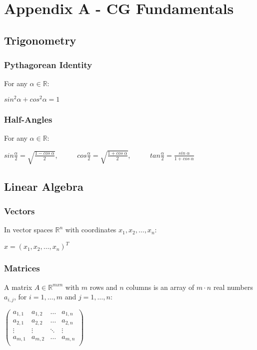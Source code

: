 \documentclass{article}
\begin{document}
\newpage

\section{Appendix A - CG Fundamentals}

\subsection{Trigonometry}
\subsubsection{Pythagorean Identity}
For any $ \alpha \in \mathbb{R} $:
\begin{center}
    $ sin^2\alpha + cos^2\alpha = 1 $
\end{center}
\subsubsection{Half-Angles}
For any $ \alpha \in \mathbb{R} $:
\begin{center}
    $ sin\displaystyle\frac{\alpha}{2} = \sqrt{\displaystyle\frac{1 - cos \ \alpha}{2}} $, \ \ \ \ \ 
    $ cos\displaystyle\frac{\alpha}{2} = \sqrt{\displaystyle\frac{1 + cos \ \alpha}{2}} $, \ \ \ \ \
    $ tan\displaystyle\frac{\alpha}{2} = \displaystyle\frac{sin \ \alpha}{1 + cos \ \alpha} $
\end{center}

\vspace{0.5cm}

\subsection{Linear Algebra}
\subsubsection{Vectors}
In vector spaces $\mathbb{R}^n$ with coordinates $x_1, x_2, \dots, x_n$:
\begin{center}
    $ x = (x_1, x_2, \dots, x_n)^T $
\end{center}
\subsubsection{Matrices}
A matrix $A \in \mathbb{R}^{mxn}$ with $m$ rows and $n$ columns is an array of $m \cdot n$ real numbers $a_{i,j}$, for $i = 1, \dots, m$ and $j = 1, \dots, n$:
\begin{center}
    $\begin{pmatrix}
        a_{1,1} & a_{1,2} & \dots & a_{1,n} \\
        a_{2,1} & a_{2,2} & \dots & a_{2,n} \\
        \vdots & \vdots & \ddots & \vdots \\
        a_{m,1} & a_{m,2} & \dots & a_{m,n} \\
    \end{pmatrix}$
\end{center}
\end{document}
